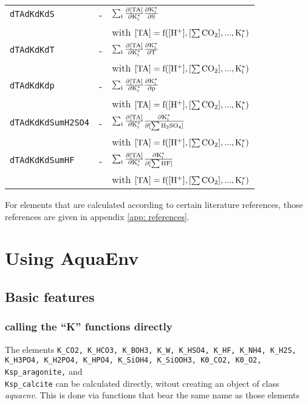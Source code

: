\documentclass[article,nojss]{jss}
\newcommand{\aq}{\textbf{\textsf{AquaEnv}}}
\begin{document}
\begin{footnotesize}
\begin{longtable}{l|l|p{7cm}}
\texttt{dTAdKdKdS}   & -                               & $\rm \sum_i \frac{\partial [TA]}{\partial K^*_i} \frac{\partial K^*_i}{\partial S}$\\
            &                                 &  with $\rm [TA] = f([H^+], [\sum CO_2], ..., K^*_i)$\\        
\texttt{dTAdKdKdT}   & -                               & $\rm \sum_i \frac{\partial [TA]}{\partial K^*_i} \frac{\partial K^*_i}{\partial T}$\\
            &                                 & with $\rm [TA] = f([H^+], [\sum CO_2], ..., K^*_i)$\\     
\texttt{dTAdKdKdp}   & -                               & $\rm \sum_i \frac{\partial [TA]}{\partial K^*_i} \frac{\partial K^*_i}{\partial p}$\\
            &                                 &  with $\rm [TA] = f([H^+], [\sum CO_2], ..., K^*_i)$\\ 
\texttt{dTAdKdKdSumH2SO4} & -                          & $\rm \sum_i \frac{\partial [TA]}{\partial K^*_i} \frac{\partial K^*_i}{\partial [\sum H_2SO_4]}$\\
            &                                 & with $\rm [TA] = f([H^+], [\sum CO_2], ..., K^*_i)$\\ 
\texttt{dTAdKdKdSumHF} & -                             & $\rm \sum_i \frac{\partial [TA]}{\partial K^*_i} \frac{\partial K^*_i}{\partial [\sum HF]}$\\
            &                                 & with $\rm [TA] = f([H^+], [\sum CO_2], ..., K^*_i)$\\    \hline
\end{longtable}
\end{footnotesize}

For elements that are calculated according to certain literature references, those references are given in appendix \ref{app: references}.

\section{Using \aq}

\subsection{Basic features}

\subsubsection{calling the ``K'' functions directly}
The elements \texttt{K\_CO2, K\_HCO3, K\_BOH3, K\_W, K\_HSO4, K\_HF, K\_NH4, K\_H2S, K\_H3PO4, K\_H2PO4, K\_HPO4, K\_SiOH4, K\_SiOOH3, K0\_CO2, K0\_O2, Ksp\_aragonite,} and \\
\texttt{Ksp\_calcite} can be calculated directly, witout creating an object of class \textit{aquaenv}. This is done via functions that bear the same name as those elements
\end{document}
